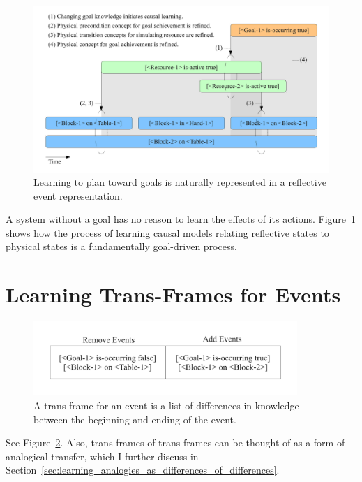 \begin{figure}[bth]
  \center
  \includegraphics[width=12cm]{gfx/learning_to_plan}
  \caption[Learning to plan toward goals]{Learning to plan toward
    goals is naturally represented in a reflective event
    representation.}
  \label{fig:learning_to_plan}
\end{figure}

A system without a goal has no reason to learn the effects of its
actions.  Figure~\ref{fig:learning_to_plan} shows how the process of
learning causal models relating reflective states to physical states
is a fundamentally goal-driven process.



\section{Learning Trans-Frames for Events}
\label{sec:learning_trans_frames_for_events}

\begin{figure}[bth]
  \center
  \includegraphics[width=10cm]{gfx/transframe}
  \caption[A trans-frame for an event]{A trans-frame for an event is a
    list of differences in knowledge between the beginning and ending
    of the event.}
  \label{fig:transframe}
\end{figure}

See Figure~\ref{fig:transframe}.  Also, trans-frames of trans-frames
can be thought of as a form of analogical transfer, which I further
discuss in
Section~\ref{sec:learning_analogies_as_differences_of_differences}.


